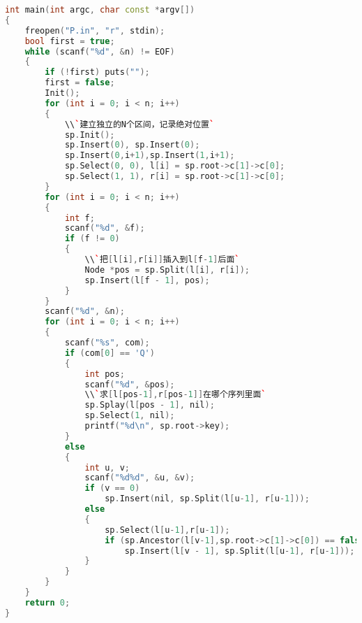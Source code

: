 \begin{lstlisting}[language=c++]
int main(int argc, char const *argv[])
{
    freopen("P.in", "r", stdin);
    bool first = true;
    while (scanf("%d", &n) != EOF)
    {
        if (!first) puts("");
        first = false;
        Init();
        for (int i = 0; i < n; i++)
        {
            \\`建立独立的N个区间，记录绝对位置`
            sp.Init();
            sp.Insert(0), sp.Insert(0);
            sp.Insert(0,i+1),sp.Insert(1,i+1);
            sp.Select(0, 0), l[i] = sp.root->c[1]->c[0];
            sp.Select(1, 1), r[i] = sp.root->c[1]->c[0];
        }
        for (int i = 0; i < n; i++)
        {
            int f;
            scanf("%d", &f);
            if (f != 0)
            {
                \\`把[l[i],r[i]]插入到l[f-1]后面`
                Node *pos = sp.Split(l[i], r[i]);
                sp.Insert(l[f - 1], pos);
            }
        }
        scanf("%d", &n);
        for (int i = 0; i < n; i++)
        {
            scanf("%s", com);
            if (com[0] == 'Q')
            {
                int pos;
                scanf("%d", &pos);
                \\`求[l[pos-1],r[pos-1]]在哪个序列里面`
                sp.Splay(l[pos - 1], nil);
                sp.Select(1, nil);
                printf("%d\n", sp.root->key);
            }
            else
            {
                int u, v;
                scanf("%d%d", &u, &v);
                if (v == 0)
                    sp.Insert(nil, sp.Split(l[u-1], r[u-1]));
                else
                {
                    sp.Select(l[u-1],r[u-1]);
                    if (sp.Ancestor(l[v-1],sp.root->c[1]->c[0]) == false)
                        sp.Insert(l[v - 1], sp.Split(l[u-1], r[u-1]));
                }
            }
        }
    }
    return 0;
}
    \end{lstlisting} 